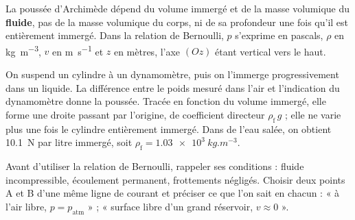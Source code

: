 \begin{attention}
La poussée d'Archimède dépend du volume immergé et de la masse volumique du \textbf{fluide}, pas de la masse volumique du
corps, ni de sa profondeur une fois qu'il est entièrement immergé. Dans la relation de Bernoulli, $p$ s'exprime en
pascals, $\rho$ en \unit{kg.m^{-3}}, $v$ en \unit{m.s^{-1}} et $z$ en mètres, l'axe $(Oz)$ étant vertical vers le haut.
\end{attention}
\begin{experience}
On suspend un cylindre à un dynamomètre, puis on l'immerge progressivement dans un liquide. La différence entre le poids
mesuré dans l'air et l'indication du dynamomètre donne la poussée. Tracée en fonction du volume immergé, elle forme une
droite passant par l'origine, de coefficient directeur $\rho_\mathrm{f}\,g$ ; elle ne varie plus une fois le cylindre
entièrement immergé. Dans de l'eau salée, on obtient \qty{10,1}{N} par litre immergé, soit
$\rho_\mathrm{f}=\qty{1,03e3}{kg.m^{-3}}$.
\end{experience}
\begin{rediger}
Avant d'utiliser la relation de Bernoulli, rappeler ses conditions : fluide incompressible, écoulement permanent,
frottements négligés. Choisir deux points A et B d'une même ligne de courant et préciser ce que l'on sait en chacun :
« à l'air libre, $p=p_\mathrm{atm}$ » ; « surface libre d'un grand réservoir, $v\approx0$ ».
\end{rediger}
\exercices

